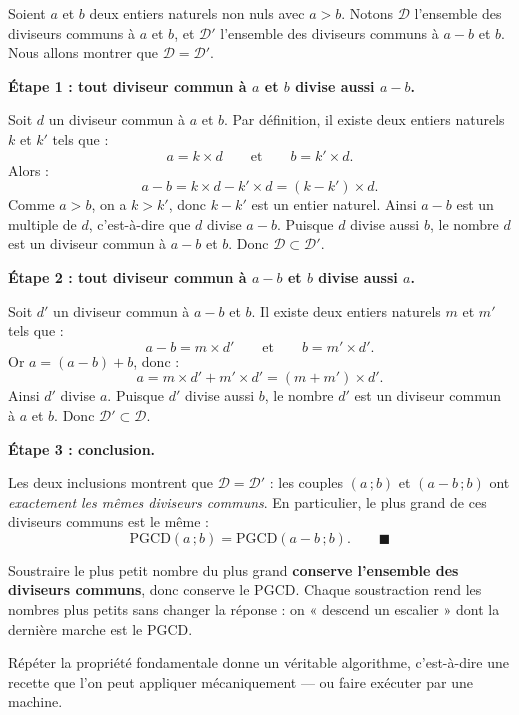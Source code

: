 \documentclass[11pt]{article}
\newcounter{popsec}
\newcounter{popsub}
\newcommand{\courssub}[1]{%
  \stepcounter{popsub}%
  \par\vspace{9pt}\noindent{\popxbold\fontsize{11.5}{13}\selectfont\color{popink}{\color{poporange}\thepopsec.\thepopsub}\hspace{6pt}#1}\par\nopagebreak\vspace{4pt}
}
\begin{document}
\begin{experience}
Soient $a$ et $b$ deux entiers naturels non nuls avec $a > b$. Notons $\mathcal{D}$ l'ensemble des diviseurs communs à $a$ et $b$, et $\mathcal{D}'$ l'ensemble des diviseurs communs à $a-b$ et $b$. Nous allons montrer que $\mathcal{D} = \mathcal{D}'$.

\textbf{Étape 1 : tout diviseur commun à $a$ et $b$ divise aussi $a-b$.}

Soit $d$ un diviseur commun à $a$ et $b$. Par définition, il existe deux entiers naturels $k$ et $k'$ tels que :
\[ a = k \times d \qquad \text{et} \qquad b = k' \times d. \]
Alors :
\[ a - b = k \times d - k' \times d = (k - k') \times d. \]
Comme $a > b$, on a $k > k'$, donc $k - k'$ est un entier naturel. Ainsi $a-b$ est un multiple de $d$, c'est-à-dire que $d$ divise $a-b$. Puisque $d$ divise aussi $b$, le nombre $d$ est un diviseur commun à $a-b$ et $b$. Donc $\mathcal{D} \subset \mathcal{D}'$.

\textbf{Étape 2 : tout diviseur commun à $a-b$ et $b$ divise aussi $a$.}

Soit $d'$ un diviseur commun à $a-b$ et $b$. Il existe deux entiers naturels $m$ et $m'$ tels que :
\[ a - b = m \times d' \qquad \text{et} \qquad b = m' \times d'. \]
Or $a = (a-b) + b$, donc :
\[ a = m \times d' + m' \times d' = (m + m') \times d'. \]
Ainsi $d'$ divise $a$. Puisque $d'$ divise aussi $b$, le nombre $d'$ est un diviseur commun à $a$ et $b$. Donc $\mathcal{D}' \subset \mathcal{D}$.

\textbf{Étape 3 : conclusion.}

Les deux inclusions montrent que $\mathcal{D} = \mathcal{D}'$ : les couples $(a\,;b)$ et $(a-b\,;b)$ ont \emph{exactement les mêmes diviseurs communs}. En particulier, le plus grand de ces diviseurs communs est le même :
\[ \mathrm{PGCD}(a\,;b) = \mathrm{PGCD}(a-b\,;b). \qquad \blacksquare \]
\end{experience}

\begin{aretenir}
Soustraire le plus petit nombre du plus grand \textbf{conserve l'ensemble des diviseurs communs}, donc conserve le PGCD. Chaque soustraction rend les nombres plus petits sans changer la réponse : on « descend un escalier » dont la dernière marche est le PGCD.
\end{aretenir}

\courssub{Description de l'algorithme}

Répéter la propriété fondamentale donne un véritable algorithme, c'est-à-dire une recette que l'on peut appliquer mécaniquement — ou faire exécuter par une machine.
\end{document}
